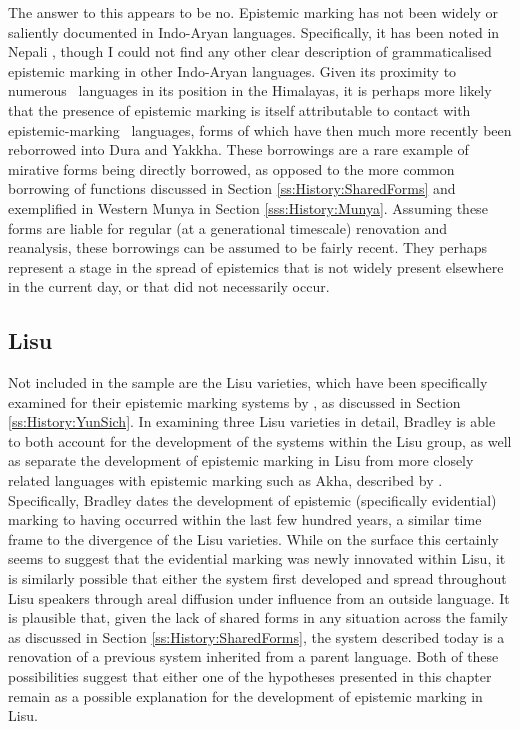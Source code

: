 The answer to this appears to be no. Epistemic marking has not been widely or saliently documented in Indo-Aryan languages. Specifically, it has been noted in Nepali \cite{Bashir2006}, though I could not find any other clear description of grammaticalised epistemic marking in other Indo-Aryan languages. Given its proximity to numerous \lfam\ languages in its position in the Himalayas, it is perhaps more likely that the presence of epistemic marking is itself attributable to contact with epistemic-marking \lfam\ languages, forms of which have then much more recently been reborrowed into Dura and Yakkha. These borrowings are a rare example of mirative forms being directly borrowed, as opposed to the more common borrowing of functions discussed in Section \ref{ss:History:SharedForms} and exemplified in Western Munya in Section \ref{sss:History:Munya}. Assuming these forms are liable for regular (at a generational timescale) renovation and reanalysis, these borrowings can be assumed to be fairly recent. They perhaps represent a stage in the spread of epistemics that is not widely present elsewhere in the current day, or that did not necessarily occur.

\subsection{Lisu}
Not included in the sample are the Lisu varieties, which have been specifically examined for their epistemic marking systems by , as discussed in Section \ref{ss:History:YunSich}. In examining three Lisu varieties in detail, Bradley is able to both account for the development of the systems within the Lisu group, as well as separate the development of epistemic marking in Lisu from more closely related languages with epistemic marking such as Akha, described by . Specifically, Bradley dates the development of epistemic (specifically evidential) marking to having occurred within the last few hundred years, a similar time frame to the divergence of the Lisu varieties. While on the surface this certainly seems to suggest that the evidential marking was newly innovated within Lisu, it is similarly possible that either the system first developed and spread throughout Lisu speakers through areal diffusion under influence from an outside language. It is plausible that, given the lack of shared forms in any situation across the family as discussed in Section \ref{ss:History:SharedForms}, the system described today is a renovation of a previous system inherited from a parent language. Both of these possibilities suggest that either one of the hypotheses presented in this chapter remain as a possible explanation for the development of epistemic marking in Lisu.

